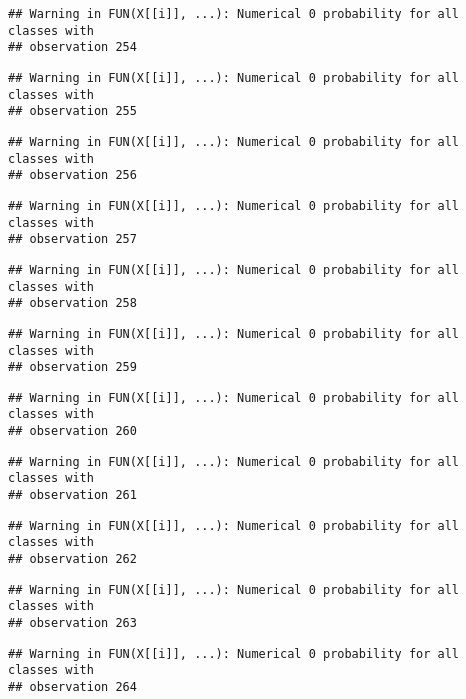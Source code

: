 \documentclass[
]{article}
\begin{document}
\begin{verbatim}
## Warning in FUN(X[[i]], ...): Numerical 0 probability for all classes with
## observation 254
\end{verbatim}

\begin{verbatim}
## Warning in FUN(X[[i]], ...): Numerical 0 probability for all classes with
## observation 255
\end{verbatim}

\begin{verbatim}
## Warning in FUN(X[[i]], ...): Numerical 0 probability for all classes with
## observation 256
\end{verbatim}

\begin{verbatim}
## Warning in FUN(X[[i]], ...): Numerical 0 probability for all classes with
## observation 257
\end{verbatim}

\begin{verbatim}
## Warning in FUN(X[[i]], ...): Numerical 0 probability for all classes with
## observation 258
\end{verbatim}

\begin{verbatim}
## Warning in FUN(X[[i]], ...): Numerical 0 probability for all classes with
## observation 259
\end{verbatim}

\begin{verbatim}
## Warning in FUN(X[[i]], ...): Numerical 0 probability for all classes with
## observation 260
\end{verbatim}

\begin{verbatim}
## Warning in FUN(X[[i]], ...): Numerical 0 probability for all classes with
## observation 261
\end{verbatim}

\begin{verbatim}
## Warning in FUN(X[[i]], ...): Numerical 0 probability for all classes with
## observation 262
\end{verbatim}

\begin{verbatim}
## Warning in FUN(X[[i]], ...): Numerical 0 probability for all classes with
## observation 263
\end{verbatim}

\begin{verbatim}
## Warning in FUN(X[[i]], ...): Numerical 0 probability for all classes with
## observation 264
\end{verbatim}
\end{document}
